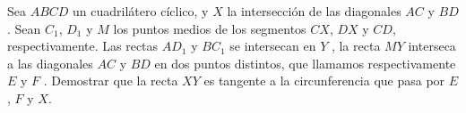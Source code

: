 Sea $ABCD$ un cuadrilátero cíclico, y $X$ la intersección de las diagonales $AC$ y $BD$.
Sean $C_1$, $D_1$ y $M$ los puntos medios de los segmentos $CX$, $DX$ y $CD$, respectivamente. Las rectas $AD_1$
y $BC_1$ se intersecan en $Y$ , la recta $MY$ interseca a las diagonales $AC$ y $BD$ en dos puntos distintos,
que llamamos respectivamente $E$ y $F$ . Demostrar que la recta $XY$ es tangente a la circunferencia que
pasa por $E$, $F$ y $X$.
